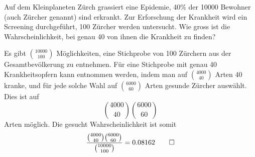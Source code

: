 Auf dem Kleinplaneten Zürch grassiert eine Epidemie, 40\% der 10000 Bewohner
(auch Zürcher genannt) sind
erkrankt. Zur Erforschung der Krankheit wird ein Screening durchgeführt,
100 Zürcher werden untersucht. Wie gross ist die Wahrscheinlichkeit,
bei genau 40 von ihnen die Krankheit zu finden?

\begin{loesung}
Es gibt $\binom{10000}{100}$ Möglichkeiten, eine Stichprobe von
100 Zürchern aus der Gesamtbevölkerung zu entnehmen. Für eine
Stichprobe mit genau 40 Krankheitsopfern kann entnommen
werden, indem man auf
$\binom{4000}{40}$ Arten 40 kranke, und für jede solche Wahl
auf $\binom{6000}{60}$ Arten
gesunde Zürcher auswählt. Dies ist auf
\[
\binom{4000}{40}\binom{6000}{60}
\]
Arten möglich.
Die gesucht Wahrscheinlichkeit ist somit
\[
\frac{\binom{4000}{40}\binom{6000}{60}}{\binom{10000}{100}}=
0.08162
\qedhere
\]
\end{loesung}

